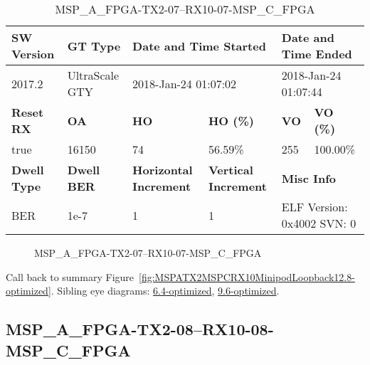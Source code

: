 \begin{table}[h]
\centering
\caption{MSP\_A\_FPGA-TX2-07--RX10-07-MSP\_C\_FPGA}
\label{tab:MSPAFPGATX207RX1007MSPCFPGA12.8-optimized}
\begin{tabular}{@{}|l|l|l|l|l|l|@{}}
\toprule
\textbf{SW Version}                & \textbf{GT Type}   & \multicolumn{2}{l|}{\textbf{Date and Time Started}}            & \multicolumn{2}{l|}{\textbf{Date and Time Ended}}        \\ \midrule
2017.2                       & UltraScale GTY          & \multicolumn{2}{l|}{2018-Jan-24 01:07:02}                   & \multicolumn{2}{l|}{2018-Jan-24 01:07:44}               \\ \midrule
\textbf{Reset RX}                  & \textbf{OA} & \textbf{HO}   & \textbf{HO (\%)} & \textbf{VO} & \textbf{VO (\%)} \\ \midrule
true & 16150        & 74          & 56.59\%        & 255        & 100.00\%       \\ \midrule
\textbf{Dwell Type}                & \textbf{Dwell BER} & \textbf{Horizontal Increment} & \textbf{Vertical Increment}    & \multicolumn{2}{l|}{\textbf{Misc Info}}                  \\ \midrule
BER                            & 1e-7        & 1        & 1           & \multicolumn{2}{l|}{ELF Version: 0x4002 SVN: 0}                         \\ \bottomrule
\end{tabular}
\end{table}

\begin{figure}[h]
\caption{MSP\_A\_FPGA-TX2-07--RX10-07-MSP\_C\_FPGA} \label{fig:MSPAFPGATX207RX1007MSPCFPGA12.8-optimized}
\end{figure}

Call back to summary Figure~\ref{fig:MSPATX2MSPCRX10MinipodLoopback12.8-optimized}.
Sibling eye diagrams: \hyperref[sec:MSPAFPGATX207RX1007MSPCFPGA6.4-optimized]{6.4-optimized}, \hyperref[sec:MSPAFPGATX207RX1007MSPCFPGA9.6-optimized]{9.6-optimized}.

\clearpage
\newpage


\subsection{MSP\_A\_FPGA-TX2-08--RX10-08-MSP\_C\_FPGA}\label{sec:MSPAFPGATX208RX1008MSPCFPGA12.8-optimized}

